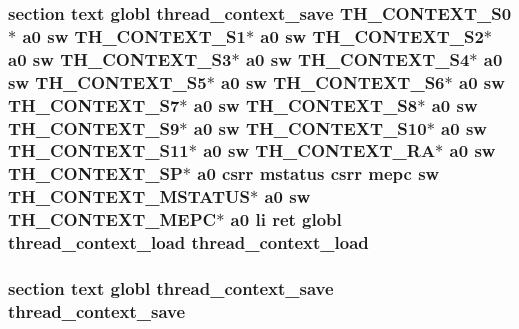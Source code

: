 \hypertarget{riscv_2threada_8S_a0b239066caf3e09af5c68b6c1cdffbab}{
\subsubsection[{thread\-\_\-context\-\_\-load}]{\setlength{\rightskip}{0pt plus 5cm}section text globl {\bf thread\-\_\-context\-\_\-save} {\bf T\-H\-\_\-\-C\-O\-N\-T\-E\-X\-T\-\_\-\-S0}$\ast$ {\bf a0} {\bf sw} {\bf T\-H\-\_\-\-C\-O\-N\-T\-E\-X\-T\-\_\-\-S1}$\ast$ {\bf a0} {\bf sw} {\bf T\-H\-\_\-\-C\-O\-N\-T\-E\-X\-T\-\_\-\-S2}$\ast$ {\bf a0} {\bf sw} {\bf T\-H\-\_\-\-C\-O\-N\-T\-E\-X\-T\-\_\-\-S3}$\ast$ {\bf a0} {\bf sw} {\bf T\-H\-\_\-\-C\-O\-N\-T\-E\-X\-T\-\_\-\-S4}$\ast$ {\bf a0} {\bf sw} {\bf T\-H\-\_\-\-C\-O\-N\-T\-E\-X\-T\-\_\-\-S5}$\ast$ {\bf a0} {\bf sw} {\bf T\-H\-\_\-\-C\-O\-N\-T\-E\-X\-T\-\_\-\-S6}$\ast$ {\bf a0} {\bf sw} {\bf T\-H\-\_\-\-C\-O\-N\-T\-E\-X\-T\-\_\-\-S7}$\ast$ {\bf a0} {\bf sw} {\bf T\-H\-\_\-\-C\-O\-N\-T\-E\-X\-T\-\_\-\-S8}$\ast$ {\bf a0} {\bf sw} {\bf T\-H\-\_\-\-C\-O\-N\-T\-E\-X\-T\-\_\-\-S9}$\ast$ {\bf a0} {\bf sw} {\bf T\-H\-\_\-\-C\-O\-N\-T\-E\-X\-T\-\_\-\-S10}$\ast$ {\bf a0} {\bf sw} {\bf T\-H\-\_\-\-C\-O\-N\-T\-E\-X\-T\-\_\-\-S11}$\ast$ {\bf a0} {\bf sw} {\bf T\-H\-\_\-\-C\-O\-N\-T\-E\-X\-T\-\_\-\-R\-A}$\ast$ {\bf a0} {\bf sw} {\bf T\-H\-\_\-\-C\-O\-N\-T\-E\-X\-T\-\_\-\-S\-P}$\ast$ {\bf a0} csrr {\bf mstatus} csrr {\bf mepc} {\bf sw} {\bf T\-H\-\_\-\-C\-O\-N\-T\-E\-X\-T\-\_\-\-M\-S\-T\-A\-T\-U\-S}$\ast$ {\bf a0} {\bf sw} {\bf T\-H\-\_\-\-C\-O\-N\-T\-E\-X\-T\-\_\-\-M\-E\-P\-C}$\ast$ {\bf a0} {\bf li} ret globl thread\-\_\-context\-\_\-load thread\-\_\-context\-\_\-load}}\label{riscv_2threada_8S_a0b239066caf3e09af5c68b6c1cdffbab}
\hypertarget{riscv_2threada_8S_a89372006bcc54436099a65419c7895d7}{
\subsubsection[{thread\-\_\-context\-\_\-save}]{\setlength{\rightskip}{0pt plus 5cm}section text globl thread\-\_\-context\-\_\-save thread\-\_\-context\-\_\-save}}\label{riscv_2threada_8S_a89372006bcc54436099a65419c7895d7}
